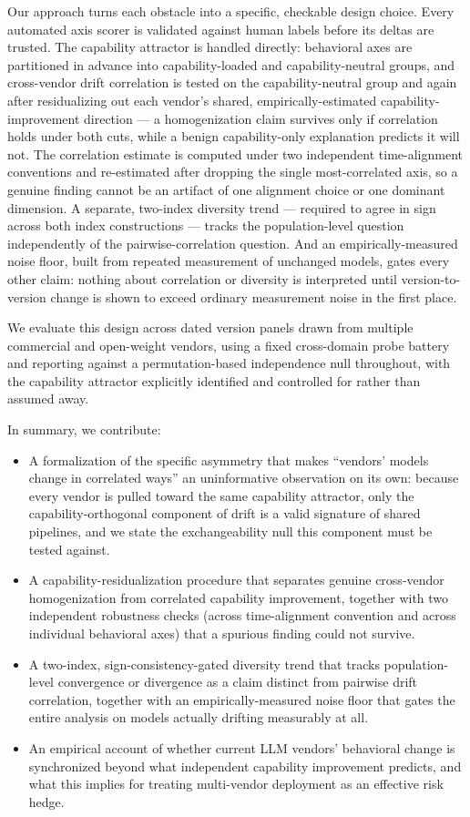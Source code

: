 \documentclass[11pt]{article}
\begin{document}
Our approach turns each obstacle into a specific, checkable design choice. Every automated axis scorer is validated against human labels before its deltas are trusted. The capability attractor is handled directly: behavioral axes are partitioned in advance into capability-loaded and capability-neutral groups, and cross-vendor drift correlation is tested on the capability-neutral group and again after residualizing out each vendor's shared, empirically-estimated capability-improvement direction --- a homogenization claim survives only if correlation holds under both cuts, while a benign capability-only explanation predicts it will not. The correlation estimate is computed under two independent time-alignment conventions and re-estimated after dropping the single most-correlated axis, so a genuine finding cannot be an artifact of one alignment choice or one dominant dimension. A separate, two-index diversity trend --- required to agree in sign across both index constructions --- tracks the population-level question independently of the pairwise-correlation question. And an empirically-measured noise floor, built from repeated measurement of unchanged models, gates every other claim: nothing about correlation or diversity is interpreted until version-to-version change is shown to exceed ordinary measurement noise in the first place.

We evaluate this design across dated version panels drawn from multiple commercial and open-weight vendors, using a fixed cross-domain probe battery and reporting against a permutation-based independence null throughout, with the capability attractor explicitly identified and controlled for rather than assumed away.

In summary, we contribute:
\begin{itemize}[leftmargin=1.4em]
\item A formalization of the specific asymmetry that makes ``vendors' models change in correlated ways'' an uninformative observation on its own: because every vendor is pulled toward the same capability attractor, only the capability-orthogonal component of drift is a valid signature of shared pipelines, and we state the exchangeability null this component must be tested against.
\item A capability-residualization procedure that separates genuine cross-vendor homogenization from correlated capability improvement, together with two independent robustness checks (across time-alignment convention and across individual behavioral axes) that a spurious finding could not survive.
\item A two-index, sign-consistency-gated diversity trend that tracks population-level convergence or divergence as a claim distinct from pairwise drift correlation, together with an empirically-measured noise floor that gates the entire analysis on models actually drifting measurably at all.
\item An empirical account of whether current LLM vendors' behavioral change is synchronized beyond what independent capability improvement predicts, and what this implies for treating multi-vendor deployment as an effective risk hedge.
\end{itemize}
\end{document}
